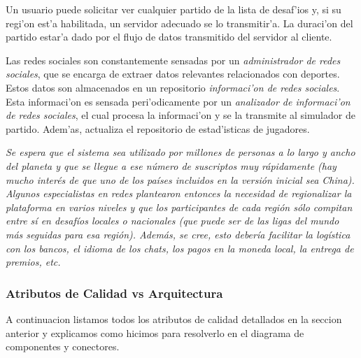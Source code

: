 Un usuario puede solicitar ver cualquier partido de la lista de desaf'ios y, si su regi'on est'a habilitada, un servidor adecuado se lo transmitir'a. La duraci'on del partido estar'a dado por el flujo de datos transmitido del servidor al cliente.

Las redes sociales son constantemente sensadas por un \textit{administrador de redes sociales}, que se encarga de extraer datos relevantes relacionados con deportes. Estos datos son almacenados en un repositorio \textit{informaci'on de redes sociales}. Esta informaci'on es sensada peri'odicamente por un \textit{analizador de informaci'on de redes sociales}, el cual procesa la informaci'on y se la transmite al simulador de partido. Adem'as, actualiza el repositorio de estad'isticas de jugadores.

\textit{Se espera que el sistema sea utilizado por millones de personas a lo largo y ancho del planeta y que se llegue a ese número de suscriptos muy rápidamente (hay mucho interés de que uno de los países incluidos en la versión inicial sea China). Algunos especialistas en redes plantearon entonces la necesidad de regionalizar la plataforma en varios niveles y que los participantes de cada región sólo compitan entre sí en desafíos locales o nacionales (que puede ser de las ligas del mundo más seguidas para esa región). Además, se cree, esto debería facilitar la logística con los bancos, el idioma de los chats, los pagos en la moneda local, la entrega de premios, etc.
}



\subsubsection{Atributos de Calidad vs Arquitectura}
A continuacion listamos todos los atributos de calidad detallados en la seccion anterior y explicamos como hicimos para resolverlo en el diagrama de componentes y conectores.

